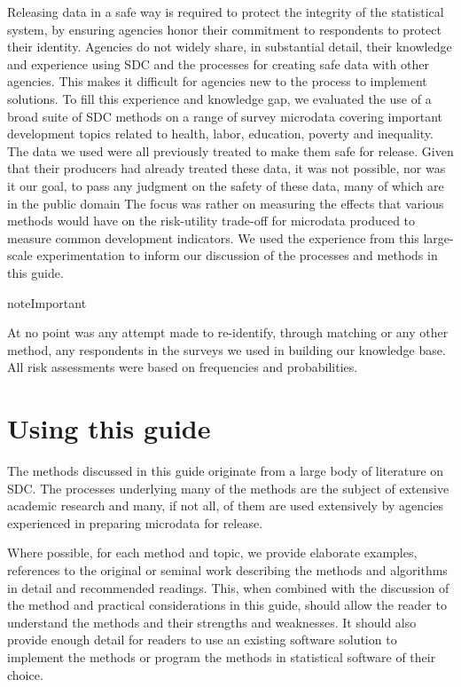 \documentclass[letterpaper,10pt,english]{sphinxmanual}
\begin{document}
Releasing data in a safe way is required to protect the integrity of the
statistical system, by ensuring agencies honor their commitment to
respondents to protect their identity. Agencies do not widely share, in
substantial detail, their knowledge and experience using SDC and the
processes for creating safe data with other agencies. This makes it
difficult for agencies new to the process to implement solutions. To
fill this experience and knowledge gap, we evaluated the use of a broad
suite of SDC methods on a range of survey microdata covering important
development topics related to health, labor, education, poverty and
inequality. The data we used were all previously treated to make them
safe for release. Given that their producers had already treated these
data, it was not possible, nor was it our goal, to pass any judgment on
the safety of these data, many of which are in the public domain The
focus was rather on measuring the effects that various methods would
have on the risk-utility trade-off for microdata produced to measure
common development indicators. We used the experience from this
large-scale experimentation to inform our discussion of the processes
and methods in this guide.

\begin{sphinxadmonition}{note}{Important}

At no point was any attempt made to re-identify, through
matching or any other method, any respondents in the surveys we used in
building our knowledge base. All risk assessments were based on
frequencies and probabilities.
\end{sphinxadmonition}


\section{Using this guide}
\label{\detokenize{intro:using-this-guide}}
The methods discussed in this guide originate from a large body of
literature on SDC. The processes underlying many of the methods are the
subject of extensive academic research and many, if not all, of them are
used extensively by agencies experienced in preparing microdata for
release.

Where possible, for each method and topic, we provide elaborate
examples, references to the original or seminal work describing the
methods and algorithms in detail and recommended readings. This, when
combined with the discussion of the method and practical considerations
in this guide, should allow the reader to understand the methods and
their strengths and weaknesses. It should also provide enough detail for
readers to use an existing software solution to implement the methods or
program the methods in statistical software of their choice.
\end{document}
